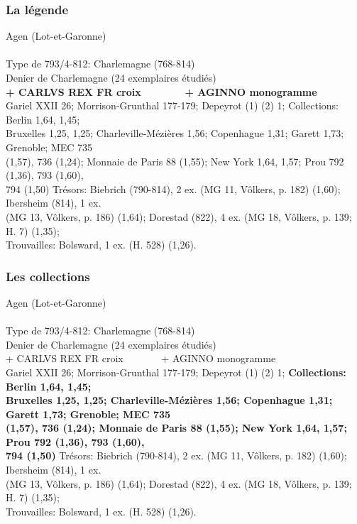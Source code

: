 \documentclass[10pt, compress]{beamer}
\begin{document}
\begin{frame}[fragile]
  \frametitle{La légende}
  \begin{scriptsize}
\textcolor{light_gray}{Agen (Lot-et-Garonne)}\\~\\

\textcolor{light_gray}{Type de 793/4-812: Charlemagne (768-814)\\
Denier de Charlemagne (24 exemplaires étudiés)}\\

\textbf{+ CARLVS REX FR croix~~~~~~~ + AGINNO monogramme}\\
\textcolor{light_gray}{
Gariel XXII 26; Morrison-Grunthal 177-179; Depeyrot (1) (2) 1; Collections: Berlin 1,64, 1,45; \\
Bruxelles 1,25, 1,25; Charleville-Mézières 1,56; Copenhague 1,31; Garett 1,73; Grenoble; MEC 735 \\
(1,57), 736 (1,24); Monnaie de Paris 88 (1,55); New York 1,64, 1,57; Prou 792 (1,36), 793 (1,60), \\
794 (1,50) Trésors: Biebrich (790-814), 2 ex. (MG 11, Vôlkers, p. 182) (1,60); Ibersheim (814), 1 ex. \\
(MG 13, Vôlkers, p. 186) (1,64); Dorestad (822), 4 ex. (MG 18, Vôlkers, p. 139; H. 7) (1,35); \\
Trouvailles: Bolsward, 1 ex. (H. 528) (1,26).
} 
    \end{scriptsize}
\end{frame}

\begin{frame}[fragile]
  \frametitle{Les collections}
  \begin{scriptsize}
\textcolor{light_gray}{Agen (Lot-et-Garonne)}\\~\\

\textcolor{light_gray}{
Type de 793/4-812: Charlemagne (768-814)\\
Denier de Charlemagne (24 exemplaires étudiés)\\
+ CARLVS REX FR croix~~~~~~~ + AGINNO monogramme
}\\
\textcolor{light_gray}{
Gariel XXII 26; Morrison-Grunthal 177-179; Depeyrot (1) (2) 1; }\textbf{Collections: Berlin 1,64, 1,45; \\
Bruxelles 1,25, 1,25; Charleville-Mézières 1,56; Copenhague 1,31; Garett 1,73; Grenoble; MEC 735 \\
(1,57), 736 (1,24); Monnaie de Paris 88 (1,55); New York 1,64, 1,57; Prou 792 (1,36), 793 (1,60), \\
794 (1,50) }\textcolor{light_gray}{Trésors: Biebrich (790-814), 2 ex. (MG 11, Vôlkers, p. 182) (1,60); Ibersheim (814), 1 ex. \\(MG 13, Vôlkers, p. 186) (1,64); Dorestad (822), 4 ex. (MG 18, Vôlkers, p. 139; H. 7) (1,35); \\Trouvailles: Bolsward, 1 ex. (H. 528) (1,26).
} 
    \end{scriptsize}
\end{frame}
\end{document}
